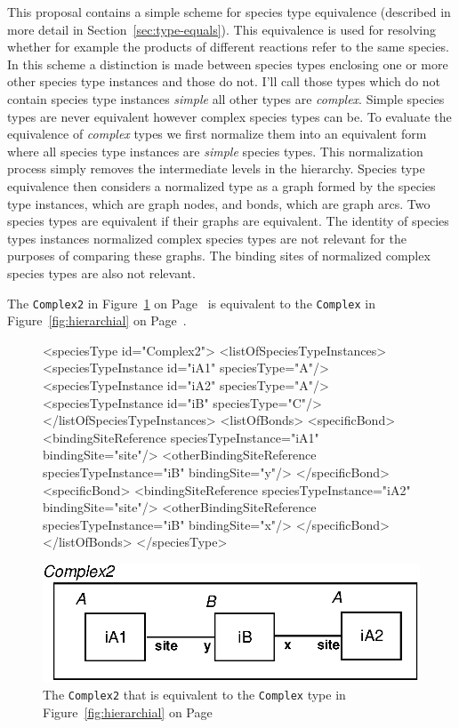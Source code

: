 \documentclass{cekarticle}
\begin{document}
This proposal contains a simple scheme for species type equivalence (described in more detail in
Section~\ref{sec:type-equals}).
This equivalence is used for resolving whether for example the products of different reactions refer
to the same species.
In this scheme
a distinction is made between species types enclosing one or more other species type instances and
those do not.  I'll call those types which do not contain species type instances \emph{simple}
all other types are \emph{complex}.
Simple species types are never equivalent however complex species types can be.  To evaluate the
equivalence of \emph{complex} types we first normalize them into an equivalent form where all species
type instances are \emph{simple} species types.  This normalization process simply removes the
intermediate levels in the hierarchy.  Species type equivalence then considers a normalized 
type as a graph formed by the species type instances, which are graph nodes, and bonds, which are
graph arcs.  
Two species types are equivalent if their graphs are equivalent.
The identity of species types instances normalized complex species types are not relevant
for the purposes of comparing these graphs.
The binding sites of normalized complex species types are also not relevant.

The \texttt{Complex2}  in Figure~\ref{fig:complex2} on Page~\pageref{fig:complex2} is
equivalent to the \texttt{Complex}  in Figure~\ref{fig:hierarchial} on
Page~\pageref{fig:hierarchial}.

\begin{figure}

\begin{example}
<speciesType id="Complex2">
    <listOfSpeciesTypeInstances>
        <speciesTypeInstance id="iA1" speciesType="A"/>
        <speciesTypeInstance id="iA2" speciesType="A"/>
        <speciesTypeInstance id="iB" speciesType="C"/>
    </listOfSpeciesTypeInstances>
    <listOfBonds>
        <specificBond>
            <bindingSiteReference speciesTypeInstance="iA1" bindingSite="site"/>
            <otherBindingSiteReference speciesTypeInstance="iB" bindingSite="y"/>
        </specificBond>
        <specificBond>
            <bindingSiteReference speciesTypeInstance="iA2" bindingSite="site"/>
            <otherBindingSiteReference speciesTypeInstance="iB" bindingSite="x"/>
        </specificBond>
    </listOfBonds>
</speciesType>
\end{example}
  \vspace*{8pt}
  \centering
  \includegraphics[scale = 0.7]{complex2.eps}
\caption{The \texttt{Complex2}  that is equivalent to the \texttt{Complex} type in
Figure~\ref{fig:hierarchial} on Page~\pageref{fig:hierarchial}} 
\label{fig:complex2}
\end{figure}
\end{document}
